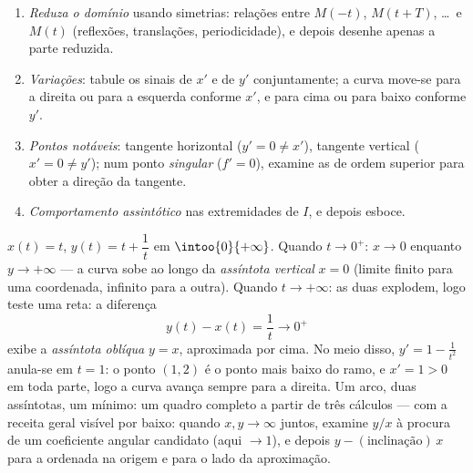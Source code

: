 \begin{method}\label{met:b1:curves:study}
\begin{enumerate}
  \item \emph{Reduza o domínio} usando simetrias: relações entre
        $M(-t)$, $M(t + T)$, \dots\ e $M(t)$ (reflexões, translações,
        periodicidade), e depois desenhe apenas a parte reduzida.
  \item \emph{Variações}: tabule os sinais de $x'$ e de $y'$
        conjuntamente; a curva move-se para a direita ou para a
        esquerda conforme $x'$, e para cima ou para baixo conforme
        $y'$.
  \item \emph{Pontos notáveis}: tangente horizontal ($y' = 0 \neq
        x'$),
        tangente vertical ($x' = 0 \neq y'$); num ponto \emph{singular}
        ($f' = 0$), examine as  de ordem superior para
        obter a direção da tangente.
  \item \emph{Comportamento assintótico} nas extremidades de $I$, e
        depois esboce.
\end{enumerate}
\end{method}

\begin{example}
\label{ex:b1:curves:asymptotes}
$x(t) = t$, $y(t) = t + \dfrac1t$ em $\intoo{0}{+\infty}$. Quando $t
\to 0^{+}$: $x \to 0$ enquanto $y \to +\infty$ --- a
curva sobe ao longo da \emph{assíntota vertical} $x = 0$ (limite
finito para uma coordenada, infinito para a outra). Quando $t \to +\infty$: as
duas  explodem, logo teste uma reta: a diferença
\[
y(t) - x(t) = \frac1t \longrightarrow 0^{+}
\]
exibe a \emph{assíntota oblíqua} $y = x$, aproximada por cima. No
meio disso, $y' = 1 - \frac1{t^2}$ anula-se em $t = 1$: o ponto $(1, 2)$ é o ponto
mais baixo do ramo, e $x' = 1 >
0$ em toda parte, logo a curva avança sempre
para a direita. Um arco, duas assíntotas, um mínimo: um quadro
completo a partir de três cálculos --- com a receita geral visível
por baixo: quando $x, y \to \infty$ juntos, examine $y/x$ à procura de um
coeficiente angular candidato (aqui $\to 1$), e depois $y - (\text{inclinação})\,x$ para a
ordenada na origem e para o lado da aproximação.
\end{example}

